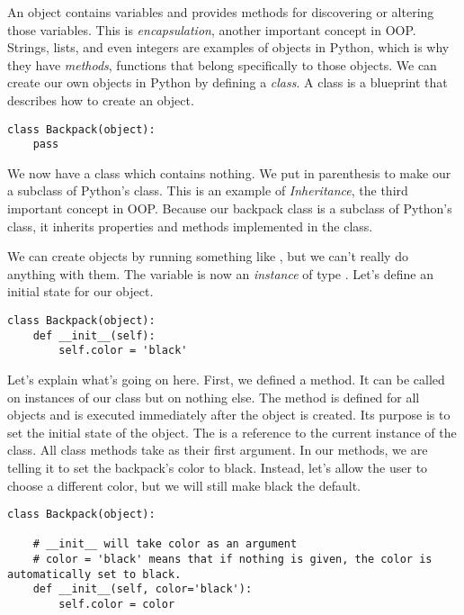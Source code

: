 An object contains variables and provides methods for discovering or altering those variables.
This is \emph{encapsulation}, another important concept in OOP.
Strings, lists, and even integers are examples of objects in Python, which is why they have \emph{methods}, functions that belong specifically to those objects.
We can create our own objects in Python by defining a \emph{class}.
A class is a blueprint that describes how to create an object.

\begin{lstlisting}
class Backpack(object):
    pass
\end{lstlisting}

We now have a class  which contains nothing.
We put  in parenthesis to make our  a subclass of Python's  class.
This is an example of \emph{Inheritance}, the third important concept in OOP.
Because our backpack class is a subclass of Python's  class, it inherits properties and methods implemented in the  class.

We can create  objects by running something like , but we can't really do anything with them.
The variable  is now an \emph{instance} of type .
Let's define an initial state for our object.

\begin{lstlisting}
class Backpack(object):
    def __init__(self):
        self.color = 'black'
\end{lstlisting}

Let's explain what's going on here.
First, we defined a method.
It can be called on instances of our class but on nothing else.
The  method is defined for all objects and is executed immediately after the object is created.
Its purpose is to set the initial state of the object.
The  is a reference to the current instance of the class.
All class methods take  as their first argument.
In our  methods, we are telling it to set the backpack's color to black.
Instead, let's allow the user to choose a different color, but we will still make black the default.

\begin{lstlisting}
class Backpack(object):

    # __init__ will take color as an argument
    # color = 'black' means that if nothing is given, the color is automatically set to black.
    def __init__(self, color='black'): 
        self.color = color
\end{lstlisting}

